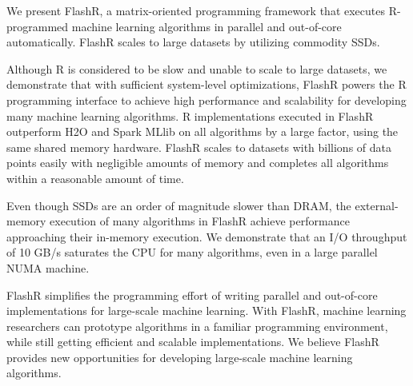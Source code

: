 We present FlashR, a matrix-oriented programming framework that executes
R-programmed machine learning algorithms in parallel and out-of-core
automatically. FlashR scales to large datasets by utilizing commodity SSDs.


Although R is considered to be slow and unable to scale to large datasets,
we demonstrate that with sufficient system-level optimizations, FlashR powers
the R programming interface to achieve high performance and scalability
for developing many machine learning algorithms. R implementations executed in FlashR
outperform H2O and Spark MLlib on all algorithms by a large factor, using
the same shared memory hardware. FlashR scales to datasets with billions of
data points easily with negligible amounts of memory and completes all
algorithms within a reasonable amount of time.

Even though SSDs are an order of magnitude slower than DRAM, the external-memory
execution of many algorithms in FlashR achieve performance approaching their in-memory
execution. We demonstrate that an I/O throughput of 10 GB/s saturates the CPU for many
algorithms, even in a large parallel NUMA machine. 

FlashR simplifies the programming effort of writing parallel and out-of-core
implementations for large-scale machine learning. With FlashR, machine learning
researchers can prototype algorithms in a familiar programming environment,
while still getting efficient and scalable implementations.
We believe FlashR provides new opportunities for developing large-scale
machine learning algorithms.

